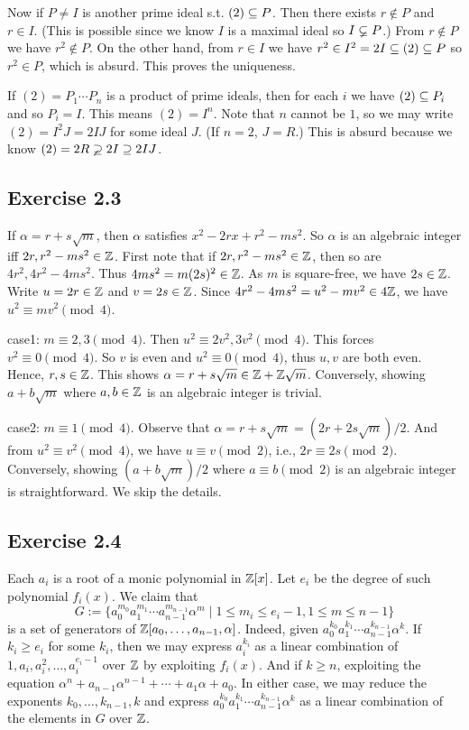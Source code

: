 \documentclass[../Marcus.tex]{subfiles}
\begin{document}
Now if $P\neq I$ is another prime ideal s.t. $(2)\subseteq P$. Then there exists $r\notin P$ and $r\in I$. (This is possible since we know $I$ is a maximal ideal so $I\varsubsetneq P$.) From $r\notin P$ we have $r^2\notin P$. On the other hand, from $r\in I$ we have $r^2\in I^2=2I \subseteq (2)\subseteq P$ so $r^2\in P$, which is absurd. This proves the uniqueness.

If $(2)=P_1\cdots P_n$ is a product of prime ideals, then for each $i$ we have $(2)\subseteq P_i$ and so $P_i=I$. This means $(2)=I^n$. Note that $n$ cannot be $1$, so we may write $(2)=I^2J=2IJ$ for some ideal $J$. (If $n=2$, $J=R$.) This is absurd because we know $(2)=2R\varsupsetneq 2I \supseteq 2IJ$.

\subsection*{Exercise 2.3}

If $\alpha=r+s\sqrt{m}$, then $\alpha$ satisfies $x^2-2rx+r^2-ms^2$. So $\alpha$ is an algebraic integer iff $2r,r^2-ms^2\in\mathbb{Z}$. First note that if $2r,r^2-ms^2\in\mathbb{Z}$, then so are $4r^2,4r^2-4ms^2$. Thus $4ms^2=m(2s)^2\in\mathbb{Z}$. As $m$ is square-free, we have $2s\in\mathbb{Z}$. Write $u=2r\in\mathbb{Z}$ and $v=2s\in\mathbb{Z}$. Since $4r^2-4ms^2=u^2-mv^2\in 4\mathbb{Z}$, we have $u^2 \equiv mv^2 \pmod{4}$.

case1: $m \equiv 2,3 \pmod{4}$. Then $u^2 \equiv 2v^2,3v^2 \pmod{4}$. This forces $v^2 \equiv 0 \pmod{4}$. So $v$ is even and $u^2 \equiv 0 \pmod{4}$, thus $u,v$ are both even. Hence, $r,s\in \mathbb{Z}$. This shows $\alpha=r+s\sqrt{m}\in \mathbb{Z}+\mathbb{Z}\sqrt{m}$. Conversely, showing $a+b\sqrt{m}$ where $a,b\in\mathbb{Z}$ is an algebraic integer is trivial.

case2: $m \equiv 1 \pmod{4}$. Observe that $\alpha=r+s\sqrt{m}=(2r+2s\sqrt{m})/2$. And from $u^2 \equiv v^2 \pmod{4}$, we have $u \equiv v \pmod{2}$, i.e., $2r \equiv 2s \pmod{2}$. Conversely, showing $(a+b\sqrt{m})/2$ where $a \equiv b \pmod{2}$ is an algebraic integer is straightforward. We skip the details.

\subsection*{Exercise 2.4}

Each $a_i$ is a root of a monic polynomial in $\mathbb{Z}[x]$. Let $e_i$ be the degree of such polynomial $f_i(x)$. We claim that $$G:=\{a_0^{m_0}a_1^{m_1}\cdots a_{n-1}^{m_{n-1}}\alpha^m \mid 1\leq m_i \leq e_i-1,1\leq m\leq n-1\}$$ is a set of generators of $\mathbb{Z}[a_0,\ldots,a_{n-1},\alpha]$. Indeed, given $a_0^{k_0}a_1^{k_1}\cdots a_{n-1}^{k_{n-1}}\alpha^k$. If $k_i\geq e_i$ for some $k_i$, then we may express $a_i^{k_i}$ as a linear combination of $1,a_i,a_i^2,\ldots,a_i^{e_i-1}$ over $\mathbb{Z}$ by exploiting $f_i(x)$. And if $k\geq n$, exploiting the equation $\alpha^n+a_{n-1}\alpha^{n-1}+\cdots+a_1\alpha+a_0$. In either case, we may reduce the exponents $k_0,\ldots,k_{n-1},k$ and express $a_0^{k_0}a_1^{k_1}\cdots a_{n-1}^{k_{n-1}}\alpha^k$ as a linear combination of the elements in $G$ over $\mathbb{Z}$.
\end{document}
